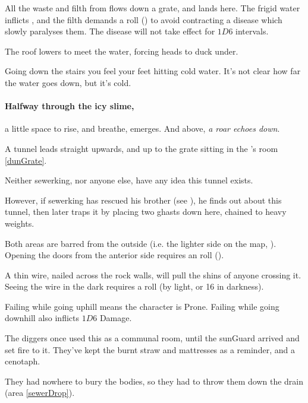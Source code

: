 All the waste and filth from  flows down a grate, and lands here.
The frigid water inflicts , and the filth demands a  roll (\tn[10]) to avoid contracting a disease which slowly paralyses them.%
The disease will not take effect for $1D6$ \glspl{interval}.

The roof lowers to meet the water, forcing heads to duck under.

\begin{boxtext}
  Going down the stairs you feel your feet hitting cold water.
  It's not clear how far the water goes down, but it's cold.
\end{boxtext}

\paragraph{Halfway through the icy slime,}
a little space to rise, and breathe, emerges.
And above, \emph{a roar echoes down}.

A tunnel leads straight upwards, and up to the grate sitting in the 's room \vref{dunGrate}.

Neither \gls{sewerking}, nor anyone else, have any idea this tunnel exists.

However, if \gls{sewerking} has rescued his brother (see ), he finds out about this tunnel, then later traps it by placing two ghasts down here, chained to heavy weights.



Both areas are barred from the outside (i.e. the lighter side on the map, ).
Opening the doors from the anterior side requires an  roll (\tn[10]).

A thin wire, nailed across the rock walls, will pull the shins of anyone crossing it.
Seeing the wire in the dark requires a  roll (\tn[12] by light, or 16 in darkness).

Failing while going uphill means the character is Prone.%
Failing while going downhill also inflicts $1D6$ Damage.


\begin{exampletext}
  The \glspl{digger} once used this as a communal room, until the \gls{sunGuard} arrived and set fire to it.
  They've kept the burnt straw and mattresses as a reminder, and a cenotaph.

  They had nowhere to bury the bodies, so they had to throw them down the drain (\gls{area} \vref{sewerDrop}).
\end{exampletext}


